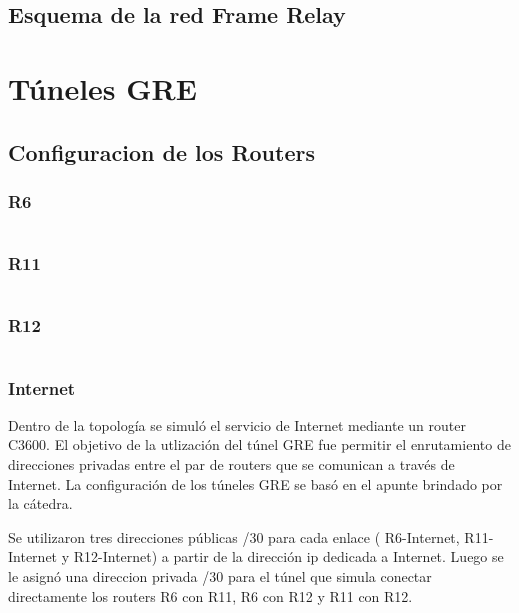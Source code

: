 \documentclass[12pt,a4paper,spanish]{article}
\begin{document}
\newpage
\subsection{Esquema de la red Frame Relay}


\newpage
\section{Túneles GRE}
\subsection{Configuracion de los Routers}
\subsubsection{R6}
{\small
\begin{verbatim}

\end{verbatim}
}

\subsubsection{R11}
{\small
\begin{verbatim}

\end{verbatim}
}

\subsubsection{R12}
{\small
\begin{verbatim}

\end{verbatim}
}

\subsubsection{Internet}

Dentro de la topología se simuló el servicio de Internet mediante un router C3600. El objetivo de la utlización del túnel GRE fue permitir el enrutamiento de direcciones privadas entre el par de routers que se comunican a través de Internet. La configuración de los túneles GRE se basó en el apunte brindado por la cátedra. 

Se utilizaron tres direcciones públicas /30 para cada enlace ( R6-Internet, R11-Internet y R12-Internet) a partir de la dirección ip dedicada a Internet. Luego se le asignó una direccion privada /30 para el túnel que simula conectar directamente los routers R6 con R11, R6 con R12 y R11 con R12. 
\end{document}
